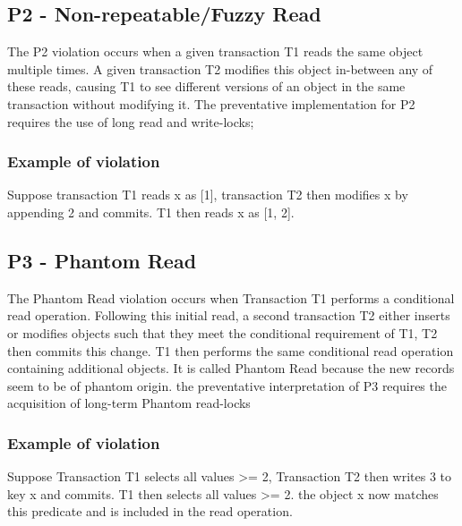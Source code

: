 \documentclass[a4paper,10pt,titlepage]{report}
\begin{document}
\subsection{P2 - Non-repeatable/Fuzzy Read}
The P2 violation occurs when a given transaction T1 reads the same object multiple times. A given transaction T2 modifies this object in-between any of these reads, causing T1 to see different versions of an object in the same transaction without modifying it. The preventative implementation for P2 requires the use of long read and write-locks; 

\subsubsection{Example of violation}
Suppose transaction T1 reads x as [1], transaction T2 then modifies x by appending 2 and commits. T1 then reads x as [1, 2].\\
\vspace{2mm}

\vspace{2mm}
 


\subsection{P3 - Phantom Read}

The Phantom Read violation occurs when Transaction T1 performs a conditional read operation. Following this initial read, a second transaction T2 either inserts or modifies objects such that they meet the conditional requirement of T1, T2 then commits this change. T1 then performs the same conditional read operation containing additional objects. It is called Phantom Read because the new records seem to be of phantom origin. the preventative interpretation of P3 requires the acquisition of long-term Phantom read-locks

\subsubsection{Example of violation}

Suppose Transaction T1 selects all values >= 2, Transaction T2 then writes 3 to key x and commits. T1 then selects all values >= 2. the object x now matches this predicate and is included in the read operation. \\
\vspace{2mm}

\vspace{2mm}
\newpage
\end{document}

